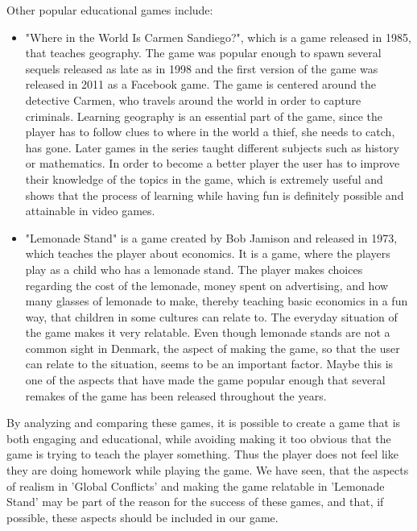 Other popular educational games include:
\begin{itemize}
\item "Where in the World Is Carmen Sandiego?", which is a game released in 1985, that teaches geography.
The game was popular enough to spawn several sequels released as late as in 1998 and the first version of the game was released in 2011 as a Facebook game.\cite{carmensandiego}
The game is centered around the detective Carmen, who travels around the world in order to capture criminals.
Learning geography is an essential part of the game, since the player has to follow clues to where in the world a thief, she needs to catch, has gone. Later games in the series taught different subjects such as history or mathematics. In order to become a better player the user has to improve their knowledge of the topics in the game, which is extremely useful and shows that the process of learning while having fun is definitely possible and attainable in video games.

\item "Lemonade Stand" is a game created by Bob Jamison and released in 1973, which teaches the player about economics.\cite{lemonadestand}
It is a game, where the players play as a child who has a lemonade stand.
The player makes choices regarding the cost of the lemonade, money spent on advertising, and how many glasses of lemonade to make, thereby teaching basic economics in a fun way, that children in some cultures can relate to.
The everyday situation of the game makes it very relatable. 
Even though lemonade stands are not a common sight in Denmark, the aspect of making the game, so that the user can relate to the situation, seems to be an important factor.
Maybe this is one of the aspects that have made the game popular enough that several remakes of the game has been released throughout the years.
\end{itemize}

By analyzing and comparing these games, it is possible to create a game that is both engaging and educational, while avoiding making it too obvious that the game is trying to teach the player something.
Thus the player does not feel like they are doing homework while playing the game.
We have seen, that the aspects of realism in 'Global Conflicts' and making the game relatable in 'Lemonade Stand' may be part of the reason for the success of these games, and that, if possible, these aspects should be included in our game.

